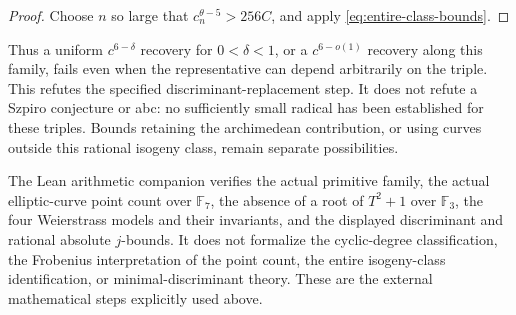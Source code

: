 \begin{proof}
Choose $n$ so large that $c_n^{\theta-5}>256C$, and apply
\eqref{eq:entire-class-bounds}.
\end{proof}

Thus a uniform $c^{6-\delta}$ recovery for $0<\delta<1$, or a
$c^{6-o(1)}$ recovery along this family, fails even when the
representative can depend arbitrarily on the triple. This refutes the
specified discriminant-replacement step. It does not refute a Szpiro
conjecture or abc: no sufficiently small radical has been established
for these triples. Bounds retaining the archimedean contribution, or
using curves outside this rational isogeny class, remain separate
possibilities.

\begin{remark}
The Lean arithmetic companion verifies the actual
primitive family, the actual elliptic-curve point count over
$\mathbb F_7$, the absence of a root of $T^2+1$ over $\mathbb F_3$,
the four Weierstrass models and their invariants, and the displayed
discriminant and rational absolute $j$-bounds.
It does not formalize the cyclic-degree classification, the
Frobenius interpretation of the point count, the entire isogeny-class
identification, or minimal-discriminant theory. These are the external
mathematical steps explicitly used above.
\end{remark}

%
